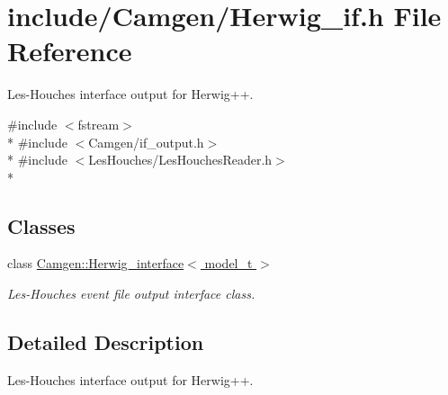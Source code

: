 \hypertarget{a00664}{}\section{include/\+Camgen/\+Herwig\+\_\+if.h File Reference}
\label{a00664}


Les-\/\+Houches interface output for Herwig++.  


{\ttfamily \#include $<$fstream$>$}\\*
{\ttfamily \#include $<$Camgen/if\+\_\+output.\+h$>$}\\*
{\ttfamily \#include $<$Les\+Houches/\+Les\+Houches\+Reader.\+h$>$}\\*
\subsection*{Classes}
\begin{DoxyCompactItemize}
\item 
class \hyperlink{a00283}{Camgen\+::\+Herwig\+\_\+interface$<$ model\+\_\+t $>$}
\begin{DoxyCompactList}\small\item\em Les-\/\+Houches event file output interface class. \end{DoxyCompactList}\end{DoxyCompactItemize}


\subsection{Detailed Description}
Les-\/\+Houches interface output for Herwig++. 

